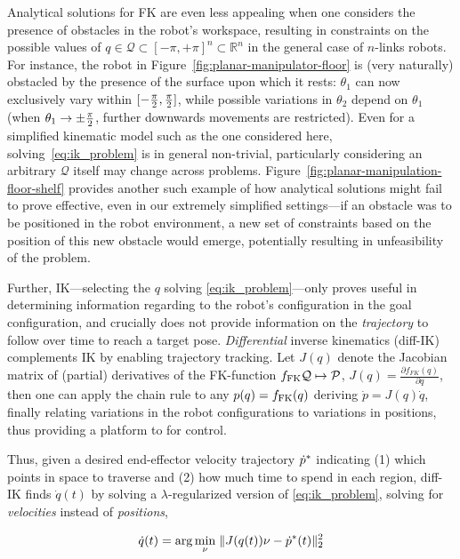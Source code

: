 Analytical solutions for FK are even less appealing when one considers the presence of obstacles in the robot's workspace, resulting in constraints on the possible values of \( q \in \mathcal Q \subset [-\pi, +\pi]^n \subset \mathbb R^n \) in the general case of \(n\)-links robots.
For instance, the robot in Figure~\ref{fig:planar-manipulator-floor} is (very naturally) obstacled by the presence of the surface upon which it rests: \( \theta_1 \) can now exclusively vary within \([-\frac{\pi}{2},  \frac{\pi}{2}] \), while possible variations in \( \theta_2 \) depend on \( \theta_1 \) (when \( \theta_1 \to \pm \frac{\pi}{2}  \), further downwards movements are restricted).
Even for a simplified kinematic model such as the one considered here, solving~\ref{eq:ik_problem} is in general non-trivial, particularly considering an arbitrary \( \mathcal Q \) itself may change across problems.
Figure~\ref{fig:planar-manipulation-floor-shelf} provides another such example of how analytical solutions might fail to prove effective, even in our extremely simplified settings---if an obstacle was to be positioned in the robot environment, a new set of constraints based on the position of this new obstacle would emerge, potentially resulting in unfeasibility of the problem.

Further, IK---selecting the \( q \) solving \ref{eq:ik_problem}---only proves useful in determining information regarding to the robot's configuration in the goal configuration, and crucially does not provide information on the \emph{trajectory} to follow over time to reach a target pose.
\emph{Differential} inverse kinematics (diff-IK) complements IK by enabling trajectory tracking. 
Let \( J(q) \) denote the Jacobian matrix of (partial) derivatives of the FK-function \( f_{\text{FK}} \mathcal Q \mapsto \mathcal P \), \( J(q) = \frac{\partial f_{FK}(q)}{\partial q } \), then one can apply the chain rule to any \( p(q) = f_{\text{FK}}(q) \) deriving \( \dot p = J(q) \dot q \), finally relating variations in the robot configurations to variations in positions, thus providing a platform to for control.

Thus, given a desired end-effector velocity trajectory \( \dot {p}^* \) indicating (1) which points in space to traverse and (2) how much time to spend in each region, diff-IK finds \( \dot q(t) \) by solving a \( \lambda \)-regularized version of \ref{eq:ik_problem}, solving for \emph{velocities} instead of \emph{positions},

\begin{align}
\dot q(t) = \arg\min_\nu \; \lVert J(q(t)) \nu - \dot {p}^* (t) \rVert_2^2
\label{eq:reg_ik_velocity}
\end{align}

